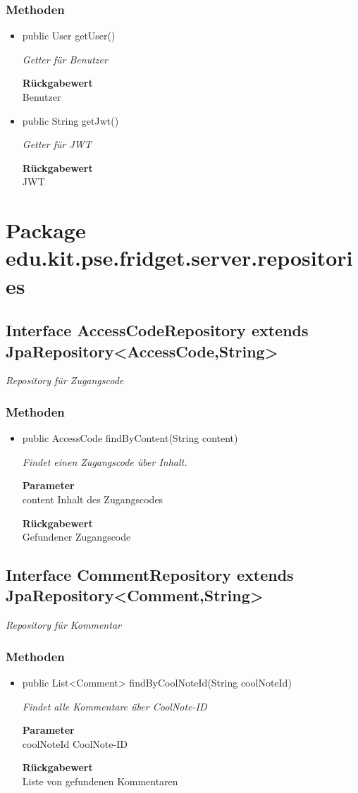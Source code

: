 \documentclass[a4paper]{scrreprt}
\begin{document}
    \subsubsection{Methoden}
    \begin{itemize}
    	\item{public User getUser()}
    	
    	\textit{Getter für Benutzer}
    	
    	
    	
    	\textbf{Rückgabewert} \\
    	Benutzer        \item{public String getJwt()}
    	
    	\textit{Getter für JWT}
    	
    	
    	
    	\textbf{Rückgabewert} \\
    	JWT
    \end{itemize}
    \section{Package edu.kit.pse.fridget.server.repositories}
    \subsection{Interface AccessCodeRepository extends JpaRepository<AccessCode,String>}
    \textit{Repository für Zugangscode}
    \subsubsection{Methoden}
    \begin{itemize}
    	\item{public AccessCode findByContent(String content)}
    	
    	\textit{Findet einen Zugangscode über Inhalt.}
    	
    	\textbf{Parameter} \\
    	content Inhalt des Zugangscodes
    	
    	\textbf{Rückgabewert} \\
    	Gefundener Zugangscode
    \end{itemize}
    \subsection{Interface CommentRepository extends JpaRepository<Comment,String>}
    \textit{Repository für Kommentar}
    \subsubsection{Methoden}
    \begin{itemize}
    	\item{public List<Comment> findByCoolNoteId(String coolNoteId)}
    	
    	\textit{Findet alle Kommentare über CoolNote-ID}
    	
    	\textbf{Parameter} \\
    	coolNoteId CoolNote-ID
    	
    	\textbf{Rückgabewert} \\
    	Liste von gefundenen Kommentaren
    \end{itemize}
\end{document}
